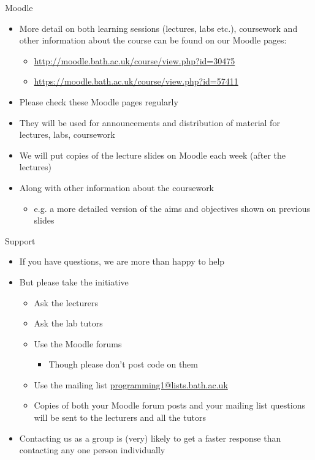 \documentclass{beamer}
\begin{document}
\begin{frame}

Moodle

\begin{itemize}
\item More detail on both learning sessions (lectures, labs etc.), coursework and other information about the course can
be found on our Moodle pages:

\begin{itemize}
\item \url{http://moodle.bath.ac.uk/course/view.php?id=30475}
\item \url{https://moodle.bath.ac.uk/course/view.php?id=57411}
\end{itemize}
\item Please check these Moodle pages regularly
\item They will be used for announcements and distribution of material for lectures, labs, coursework
\item We will put copies of the lecture slides on Moodle each week (after the lectures)
\item Along with other information about the coursework

\begin{itemize}
\item e.g. a more detailed version of the aims and objectives shown on previous slides
\end{itemize}
\end{itemize}
\end{frame} 

\begin{frame}

Support

\begin{itemize}
\item If you have questions, we are more than happy to help
\item But please take the initiative

\begin{itemize}
\item Ask the lecturers
\item Ask the lab tutors
\item Use the Moodle forums

\begin{itemize}
\item Though please don{}'t post code on them
\end{itemize}
\item Use the mailing list \href{mailto:programming1@lists.bath.ac.uk}{programming1@lists.bath.ac.uk}
\item Copies of both your Moodle forum posts and your mailing list questions will be sent to the lecturers and all the
tutors
\end{itemize}
\item Contacting us as a group is (very) likely to get a faster response than contacting any one person individually
\end{itemize}
\end{frame}
\end{document}

